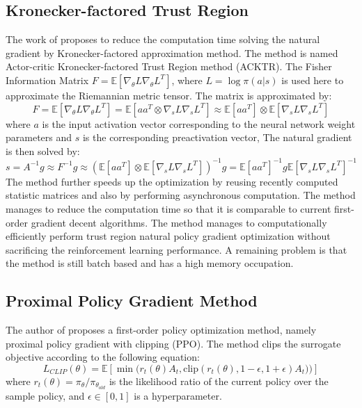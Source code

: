 \subsection{Kronecker-factored Trust Region}
The work of \cite{wu2017scalable} proposes to reduce the computation time solving the natural gradient by Kronecker-factored approximation method. The method is named Actor-critic  Kronecker-factored Trust Region method (ACKTR).
The Fisher Information Matrix $F=\mathbb{E}[\nabla_\theta L \nabla_\theta L^T]$, where $L=\log\pi(a|s)$ is used here to approximate the Riemannian metric tensor.
The matrix is approximated by:
\begin{equation*}
    F=\mathbb{E}[\nabla_\theta L \nabla_\theta L^T] = \mathbb{E}[aa^T \otimes \nabla_s L \nabla_s L^T ] 
    \approx \mathbb{E}[aa^T] \otimes \mathbb{E}[\nabla_s L \nabla_s L^T ] 
\end{equation*}
where $a$ is the input activation vector corresponding to the neural network weight parameters and $s$ is the corresponding preactivation vector,
The natural gradient is then solved by:
\begin{equation}
    s=A^{-1}g \approx F^{-1}g \approx \left(\mathbb{E}[aa^T] \otimes \mathbb{E}[\nabla_s L \nabla_s L^T ] \right)^{-1}g = \mathbb{E}[aa^T]^{-1} g  \mathbb{E}[\nabla_s L \nabla_s L^T ]^{-1}
\end{equation}
The method further speeds up the optimization by reusing recently computed statistic matrices and also by performing asynchronous computation. The method manages to reduce the computation time so that it is comparable to current first-order gradient decent algorithms.
The method manages to computationally efficiently perform trust region natural policy gradient optimization without sacrificing the reinforcement learning performance. A remaining problem is that the method is still batch based and has a high memory occupation.

\subsection{Proximal Policy Gradient Method}
The author of \cite{schulman2017proximal} proposes a first-order policy optimization method, namely proximal policy gradient with clipping (PPO). The method clips the surrogate objective according to the following equation:
\begin{equation}
    L_{CLIP}(\theta) = \mathbb{E} \left[ \min\big(r_t(\theta) A_t , \mathrm{clip}(r_t(\theta),1-\epsilon,1+\epsilon)A_t)\big) \right]
\end{equation}
where $r_t(\theta) = \pi_\theta / \pi_{\theta_{old}}$ is the likelihood ratio of the current policy over the sample policy, and $\epsilon \in [0,1]$ is a hyperparameter. 

